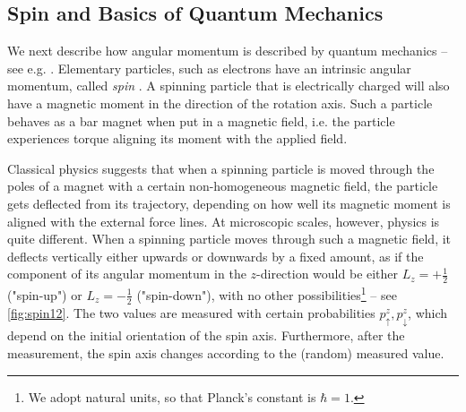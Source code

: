 \documentclass[12pt,final,3p]{elsarticle}
\begin{document}
\subsection{Spin and Basics of Quantum Mechanics}\label{sec:rotational:quantum}
We next describe how angular momentum is described by quantum mechanics -- see e.g. \cite{penrose2006road,townsend2000modern}. Elementary particles, such as electrons have an intrinsic angular momentum, called \emph{spin} \cite{weiss2001spin}. A spinning particle that is electrically charged will also have a magnetic moment in the direction of the rotation axis. Such a particle behaves as a bar magnet when put in a magnetic field, i.e. the particle experiences torque aligning its moment with the applied field.

Classical physics suggests that when a spinning particle is moved through the poles of a magnet with a certain non-homogeneous magnetic field, the particle gets deflected from its trajectory, depending on how well its magnetic moment is aligned with the external force lines. At microscopic scales, however, physics is quite different. When a spinning particle moves through such a magnetic field, it deflects vertically either upwards or downwards by a fixed amount, as if the component of its angular momentum in the $z$-direction would be either $L_z = +\frac{1}{2}$ ("spin-up") or $L_z = -\frac{1}{2}$ ("spin-down"), with no other possibilities\footnote{We adopt natural units, so that Planck's constant is $\hbar = 1$.} -- see \autoref{fig:spin12}. The two values are measured with certain probabilities $p^{z}_{\uparrow}, p^{z}_{\downarrow}$, which depend on the initial orientation of the spin axis. Furthermore, after the measurement, the spin axis changes according to the (random) measured value.
\end{document}
